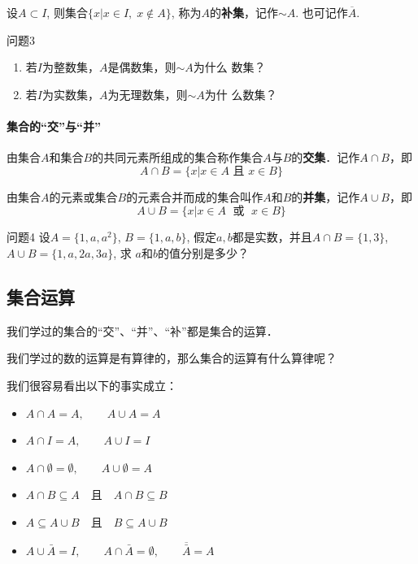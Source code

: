 设$A\subset I$, 则集合$\{x|x\in I,\; x\notin A\}$, 称为$A$的\textbf{补集}，记作$\sim A$. 也可记作$\overline{A}$.

\begin{blk}{问题3}
\begin{enumerate}
    \item 若$I$为整数集，$A$是偶数集，则$\sim A$为什么
数集？
\item 若$I$为实数集，$A$为无理数集，则$\sim A$为什
么数集？
\end{enumerate}
\end{blk}

\paragraph{集合的“交”与“并”}

由集合$A$和集合$B$的共同元素所组成的集合称作集合$A$与$B$的\textbf{交集}．记作$A\cap B$，即
\[A\cap B=\{x|x\in A\text{ 且 }x\in B\}\]

由集合$A$的元素或集合$B$的元素合并而成的集合叫作$A$和$B$的\textbf{并集}，记作$A\cup B$，即
\[A\cup B=\{x|x\in A\; \text{ 或 }\; x\in B\}\]

\begin{blk}{问题4}
    设$A=\{1,a,a^2\}$, $B=\{1,a,b\}$, 假定$a,b$都是实数，并且$A\cap B=\{1, 3\}$, $A\cup B=\{1,a,2a,3a\}$, 求
$a$和$b$的值分别是多少？
\end{blk}


\subsection{集合运算}

我们学过的集合的“交”、“并”、“补”都是集合的运算．

我们学过的数的运算是有算律的，那么集合的运算有什么算律呢？

我们很容易看出以下的事实成立：

\begin{blk}{}
\begin{itemize}
    \item $    A\cap A=A,\qquad     A\cup A=A$
\item $    A\cap I=A,\qquad    A\cup I=I$
\item $    A\cap \emptyset=\emptyset,\qquad  A\cup \emptyset=A$
\item $    A\cap B\subseteq A \quad \text{且}\quad A\cap B\subseteq B$
\item $A\subseteq A\cup B \quad \text{且}\quad B\subseteq A\cup B$
\item $A\cup \bar{A}=I,\qquad A\cap \bar{A}=\emptyset,\qquad \overline{\bar{A}}=A$    
\end{itemize}
\end{blk}

